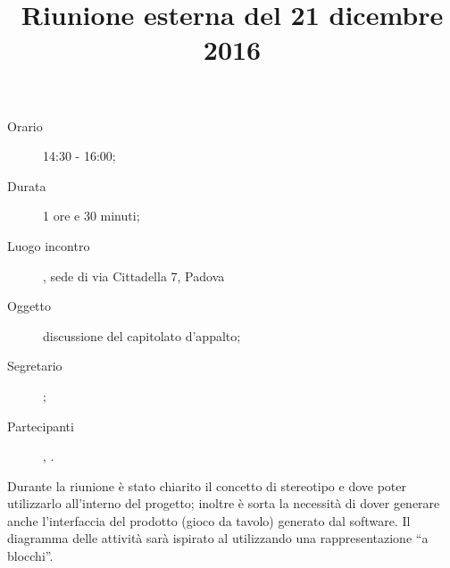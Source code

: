 


\author{\PB}
\supervisor{\MM}
\title{Riunione esterna del 21 dicembre 2016}



\maketitle

\begin{description}
	\item[Orario] 14:30 - 16:00;
	\item[Durata] 1 ore e 30 minuti;
	\item[Luogo incontro] \ZU, sede di via Cittadella 7, Padova
	\item[Oggetto] discussione del capitolato d'appalto;
	\item[Segretario] \AZ; 
	\item[Partecipanti] \GP, \ALL.
\end{description}

Durante la riunione è stato chiarito il concetto di stereotipo e dove poter utilizzarlo all'interno del progetto; inoltre è sorta la necessità di dover generare anche l'interfaccia del prodotto (gioco da tavolo) generato dal software. Il diagramma delle attività sarà ispirato al  utilizzando una rappresentazione “a blocchi”.


